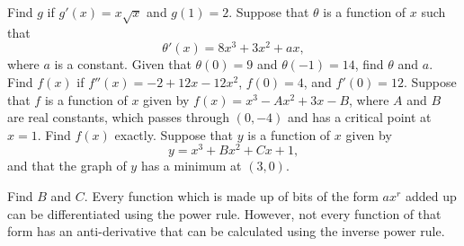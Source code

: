 \begin{questions}
  \question Find $ g $ if $ g'(x) = x \sqrt{x} $ and $ g(1) =  2 $.
  \question Suppose that $ \theta $ is a function of $ x $ such that
            \begin{displaymath}
              \theta'(x) = 8x^3 + 3x^2 + ax,
            \end{displaymath}
            where $ a $ is a constant. Given that $ \theta(0) = 9 $ and $ \theta(-1) = 14 $, find $ \theta $ and $ a $.
  \question Find $ f(x) $ if $ f''(x) = -2 + 12x - 12x^2 $, $ f(0) = 4 $, and $ f'(0) = 12 $.
  \question Suppose that $ f $ is a function of $ x $ given by $ f(x) = x^3 - Ax^2 + 3x - B $, where $ A $ and $ B $ are real constants,
            which passes through $ (0,-4) $ and has a critical point at $ x = 1 $. Find $ f(x) $ exactly.
  \question Suppose that $ y $ is a function of $ x $ given by
            \begin{displaymath}
              y = x^3 + Bx^2 + Cx + 1,
            \end{displaymath}
            and that the graph of $ y $ has a minimum at $ (3,0) $.

            Find $ B $ and $ C $.
  \question Every function which is made up of bits of the form $ ax^r $ added up can be differentiated using the power rule.
            However, not every function of that form has an anti-derivative that can be calculated using the inverse power rule.
\end{questions}
